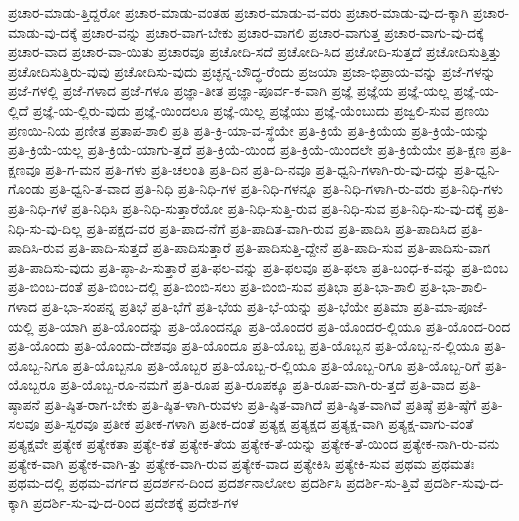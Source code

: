 {ಪ್ರಚಾರ-ಮಾಡು-ತ್ತಿದ್ದರೋ
ಪ್ರಚಾರ-ಮಾಡು-ವಂತಹ
ಪ್ರಚಾರ-ಮಾಡು-ವ-ವರು
ಪ್ರಚಾರ-ಮಾಡು-ವು-ದ-ಕ್ಕಾಗಿ
ಪ್ರಚಾರ-ಮಾಡು-ವು-ದಕ್ಕೆ
ಪ್ರಚಾರ-ವನ್ನು
ಪ್ರಚಾರ-ವಾಗ-ಬೇಕು
ಪ್ರಚಾರ-ವಾಗಲಿ
ಪ್ರಚಾರ-ವಾಗುತ್ತ
ಪ್ರಚಾರ-ವಾಗು-ವು-ದಕ್ಕೆ
ಪ್ರಚಾರ-ವಾದ
ಪ್ರಚಾರ-ವಾ-ಯಿತು
ಪ್ರಚಾರವೂ
ಪ್ರಚೋದಿ-ಸದೆ
ಪ್ರಚೋದಿ-ಸಿದ
ಪ್ರಚೋದಿ-ಸುತ್ತದೆ
ಪ್ರಚೋದಿಸುತ್ತಿತ್ತು
ಪ್ರಚೋದಿಸುತ್ತಿರು-ವುವು
ಪ್ರಚೋದಿಸು-ವುದು
ಪ್ರಚ್ಛನ್ನ-ಬೌದ್ಧ-ರೆಂದು
ಪ್ರಜಯಾ
ಪ್ರಜಾ-ಭಿಪ್ರಾಯ-ವನ್ನು
ಪ್ರಜೆ-ಗಳನ್ನು
ಪ್ರಜೆ-ಗಳಲ್ಲಿ
ಪ್ರಜೆ-ಗಳಾದ
ಪ್ರಜೆ-ಗಳೂ
ಪ್ರಜ್ಞಾ-ತೀತ
ಪ್ರಜ್ಞಾ-ಪೂರ್ವ-ಕ-ವಾಗಿ
ಪ್ರಜ್ಞೆ
ಪ್ರಜ್ಞೆಯ
ಪ್ರಜ್ಞೆ-ಯಲ್ಲ
ಪ್ರಜ್ಞೆ-ಯ-ಲ್ಲಿದೆ
ಪ್ರಜ್ಞೆ-ಯ-ಲ್ಲಿರು-ವುದು
ಪ್ರಜ್ಞೆ-ಯಿಂದಲೂ
ಪ್ರಜ್ಞೆ-ಯಿಲ್ಲ
ಪ್ರಜ್ಞೆಯು
ಪ್ರಜ್ಞೆ-ಯೆಂಬುದು
ಪ್ರಜ್ವಲಿ-ಸುವ
ಪ್ರಣಯಿ
ಪ್ರಣಯಿ-ನಿಯ
ಪ್ರಣೀತ
ಪ್ರತಾಪ-ಶಾಲಿ
ಪ್ರತಿ
ಪ್ರತಿ-ಕ್ರಿ-ಯಾ-ವ-ಸ್ಥೆಯೇ
ಪ್ರತಿ-ಕ್ರಿಯೆ
ಪ್ರತಿ-ಕ್ರಿಯೆಯ
ಪ್ರತಿ-ಕ್ರಿಯೆ-ಯನ್ನು
ಪ್ರತಿ-ಕ್ರಿಯೆ-ಯಲ್ಲ
ಪ್ರತಿ-ಕ್ರಿಯೆ-ಯಾಗು-ತ್ತದೆ
ಪ್ರತಿ-ಕ್ರಿಯೆ-ಯಿಂದ
ಪ್ರತಿ-ಕ್ರಿಯೆ-ಯಿಂದಲೇ
ಪ್ರತಿ-ಕ್ರಿಯೆಯೇ
ಪ್ರತಿ-ಕ್ಷಣ
ಪ್ರತಿ-ಕ್ಷಣವೂ
ಪ್ರತಿ-ಗ-ಮನ
ಪ್ರತಿ-ಗಳು
ಪ್ರತಿ-ಚಲಂತಿ
ಪ್ರತಿ-ದಿನ
ಪ್ರತಿ-ದಿ-ನವೂ
ಪ್ರತಿ-ಧ್ವನಿ-ಗಳಾಗಿ-ರು-ವು-ದನ್ನು
ಪ್ರತಿ-ಧ್ವನಿ-ಗೊಂಡು
ಪ್ರತಿ-ಧ್ವನಿ-ತ-ವಾದ
ಪ್ರತಿ-ನಿಧಿ
ಪ್ರತಿ-ನಿಧಿ-ಗಳ
ಪ್ರತಿ-ನಿಧಿ-ಗಳನ್ನೂ
ಪ್ರತಿ-ನಿಧಿ-ಗಳಾಗಿ-ರು-ವರು
ಪ್ರತಿ-ನಿಧಿ-ಗಳು
ಪ್ರತಿ-ನಿಧಿ-ಗಳೆ
ಪ್ರತಿ-ನಿಧಿಸಿ
ಪ್ರತಿ-ನಿಧಿ-ಸುತ್ತಾರೆಯೋ
ಪ್ರತಿ-ನಿಧಿ-ಸುತ್ತಿ-ರುವ
ಪ್ರತಿ-ನಿಧಿ-ಸುವ
ಪ್ರತಿ-ನಿಧಿ-ಸು-ವು-ದಕ್ಕೆ
ಪ್ರತಿ-ನಿಧಿ-ಸು-ವು-ದಿಲ್ಲ
ಪ್ರತಿ-ಪಕ್ಷದ-ವರ
ಪ್ರತಿ-ಪಾದ-ನೆಗೆ
ಪ್ರತಿ-ಪಾದಿತ-ವಾಗಿ-ರುವ
ಪ್ರತಿ-ಪಾದಿಸಿ
ಪ್ರತಿ-ಪಾದಿಸಿದ
ಪ್ರತಿ-ಪಾದಿಸಿ-ರುವ
ಪ್ರತಿ-ಪಾದಿ-ಸುತ್ತದೆ
ಪ್ರತಿ-ಪಾದಿಸುತ್ತಾರೆ
ಪ್ರತಿ-ಪಾದಿಸುತ್ತಿ-ದ್ದೇನೆ
ಪ್ರತಿ-ಪಾದಿ-ಸುವ
ಪ್ರತಿ-ಪಾದಿಸು-ವಾಗ
ಪ್ರತಿ-ಪಾದಿಸು-ವುದು
ಪ್ರತಿ-ಪ್ಠಾ-ಪಿ-ಸುತ್ತಾರೆ
ಪ್ರತಿ-ಫಲ-ವನ್ನು
ಪ್ರತಿ-ಫಲವೂ
ಪ್ರತಿ-ಫಲಾ
ಪ್ರತಿ-ಬಂಧ-ಕ-ವನ್ನು
ಪ್ರತಿ-ಬಿಂಬ
ಪ್ರತಿ-ಬಿಂಬ-ದಂತೆ
ಪ್ರತಿ-ಬಿಂಬ-ದಲ್ಲಿ
ಪ್ರತಿ-ಬಿಂಬಿ-ಸಲು
ಪ್ರತಿ-ಬಿಂಬಿ-ಸುವ
ಪ್ರತಿಭಾ
ಪ್ರತಿ-ಭಾ-ಶಾಲಿ
ಪ್ರತಿ-ಭಾ-ಶಾಲಿ-ಗಳಾದ
ಪ್ರತಿ-ಭಾ-ಸಂಪನ್ನ
ಪ್ರತಿಭೆ
ಪ್ರತಿ-ಭೆಗೆ
ಪ್ರತಿ-ಭೆಯ
ಪ್ರತಿ-ಭೆ-ಯನ್ನು
ಪ್ರತಿ-ಭೆಯೇ
ಪ್ರತಿಮಾ
ಪ್ರತಿ-ಮಾ-ಪೂಜೆ-ಯಲ್ಲಿ
ಪ್ರತಿ-ಯಾಗಿ
ಪ್ರತಿ-ಯೊಂದನ್ನು
ಪ್ರತಿ-ಯೊಂದನ್ನೂ
ಪ್ರತಿ-ಯೊಂದರ
ಪ್ರತಿ-ಯೊಂದರ-ಲ್ಲಿಯೂ
ಪ್ರತಿ-ಯೊಂದ-ರಿಂದ
ಪ್ರತಿ-ಯೊಂದು
ಪ್ರತಿ-ಯೊಂದು-ದೇಶವೂ
ಪ್ರತಿ-ಯೊಂದೂ
ಪ್ರತಿ-ಯೊಬ್ಬ
ಪ್ರತಿ-ಯೊಬ್ಬನ
ಪ್ರತಿ-ಯೊಬ್ಬ-ನ-ಲ್ಲಿಯೂ
ಪ್ರತಿ-ಯೊಬ್ಬ-ನಿಗೂ
ಪ್ರತಿ-ಯೊಬ್ಬನೂ
ಪ್ರತಿ-ಯೊಬ್ಬರ
ಪ್ರತಿ-ಯೊಬ್ಬ-ರ-ಲ್ಲಿಯೂ
ಪ್ರತಿ-ಯೊಬ್ಬ-ರಿಗೂ
ಪ್ರತಿ-ಯೊಬ್ಬ-ರಿಗೆ
ಪ್ರತಿ-ಯೊಬ್ಬರೂ
ಪ್ರತಿ-ಯೊಬ್ಬ-ರೂ-ನಮಗೆ
ಪ್ರತಿ-ರೂಪ
ಪ್ರತಿ-ರೂಪಕ್ಕೂ
ಪ್ರತಿ-ರೂಪ-ವಾಗಿ-ರು-ತ್ತದೆ
ಪ್ರತಿ-ವಾದ
ಪ್ರತಿ-ಷ್ಠಾಪನೆ
ಪ್ರತಿ-ಷ್ಠಿತ-ರಾಗ-ಬೇಕು
ಪ್ರತಿ-ಷ್ಠಿತ-ಳಾಗಿ-ರುವಳು
ಪ್ರತಿ-ಷ್ಠಿತ-ವಾಗಿದೆ
ಪ್ರತಿ-ಷ್ಠಿತ-ವಾಗಿವೆ
ಪ್ರತಿಷ್ಠೆ
ಪ್ರತಿ-ಷ್ಠೆಗೆ
ಪ್ರತಿ-ಸಲವೂ
ಪ್ರತಿ-ಸ್ವರವೂ
ಪ್ರತೀಕ
ಪ್ರತೀಕ-ಗಳಾಗಿ
ಪ್ರತೀಕ-ದಂತೆ
ಪ್ರತ್ಯಕ್ಷ
ಪ್ರತ್ಯಕ್ಷದ
ಪ್ರತ್ಯಕ್ಷ-ವಾಗಿ
ಪ್ರತ್ಯಕ್ಷ-ವಾಗು-ವಂತೆ
ಪ್ರತ್ಯಕ್ಷವೇ
ಪ್ರತ್ಯೇಕ
ಪ್ರತ್ಯೇಕತಾ
ಪ್ರತ್ಯೇ-ಕತೆ
ಪ್ರತ್ಯೇಕ-ತೆಯ
ಪ್ರತ್ಯೇಕ-ತೆ-ಯನ್ನು
ಪ್ರತ್ಯೇಕ-ತೆ-ಯಿಂದ
ಪ್ರತ್ಯೇಕ-ನಾಗಿ-ರು-ವನು
ಪ್ರತ್ಯೇಕ-ವಾಗಿ
ಪ್ರತ್ಯೇಕ-ವಾಗಿ-ತ್ತು
ಪ್ರತ್ಯೇಕ-ವಾಗಿ-ರುವ
ಪ್ರತ್ಯೇಕ-ವಾದ
ಪ್ರತ್ಯೇಕಿಸಿ
ಪ್ರತ್ಯೇಕಿ-ಸುವ
ಪ್ರಥಮ
ಪ್ರಥಮತಃ
ಪ್ರಥಮ-ದಲ್ಲಿ
ಪ್ರಥಮ-ವರ್ಗದ
ಪ್ರದರ್ಶನ-ದಿಂದ
ಪ್ರದರ್ಶನಾಲೋಲ
ಪ್ರದರ್ಶಿಸಿ
ಪ್ರದರ್ಶಿ-ಸು-ತ್ತಿವೆ
ಪ್ರದರ್ಶಿ-ಸುವು-ದ-ಕ್ಕಾಗಿ
ಪ್ರದರ್ಶಿ-ಸು-ವು-ದ-ರಿಂದ
ಪ್ರದೇಶಕ್ಕೆ
ಪ್ರದೇಶ-ಗಳ
}
